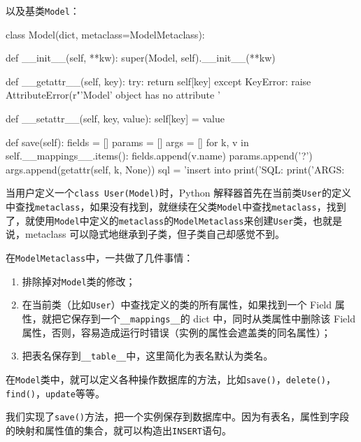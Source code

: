 以及基类\texttt{Model}：

\begin{pythoncode}
class Model(dict, metaclass=ModelMetaclass):

    def __init__(self, **kw):
        super(Model, self).__init__(**kw)

    def __getattr__(self, key):
        try:
            return self[key]
        except KeyError:
            raise AttributeError(r"'Model' object has no attribute '%

    def __setattr__(self, key, value):
        self[key] = value

    def save(self):
        fields = []
        params = []
        args = []
        for k, v in self.__mappings__.items():
            fields.append(v.name)
            params.append('?')
            args.append(getattr(self, k, None))
        sql = 'insert into %
        print('SQL: %
        print('ARGS: %
\end{pythoncode}

当用户定义一个\texttt{class\ User(Model)}时，Python
解释器首先在当前类\texttt{User}的定义中查找\texttt{metaclass}，如果没有找到，就继续在父类\texttt{Model}中查找\texttt{metaclass}，找到了，就使用\texttt{Model}中定义的\texttt{metaclass}的\texttt{ModelMetaclass}来创建\texttt{User}类，也就是说，metaclass
可以隐式地继承到子类，但子类自己却感觉不到。

在\texttt{ModelMetaclass}中，一共做了几件事情：

\begin{enumerate}
\def\labelenumi{\arabic{enumi}.}
\item
  排除掉对\texttt{Model}类的修改；
\item
  在当前类（比如\texttt{User}）中查找定义的类的所有属性，如果找到一个
  Field 属性，就把它保存到一个\texttt{\_\_mappings\_\_}的 dict
  中，同时从类属性中删除该 Field
  属性，否则，容易造成运行时错误（实例的属性会遮盖类的同名属性）；
\item
  把表名保存到\texttt{\_\_table\_\_}中，这里简化为表名默认为类名。
\end{enumerate}

在\texttt{Model}类中，就可以定义各种操作数据库的方法，比如\texttt{save()}，\texttt{delete()}，\texttt{find()}，\texttt{update}等等。

我们实现了\texttt{save()}方法，把一个实例保存到数据库中。因为有表名，属性到字段的映射和属性值的集合，就可以构造出\texttt{INSERT}语句。

